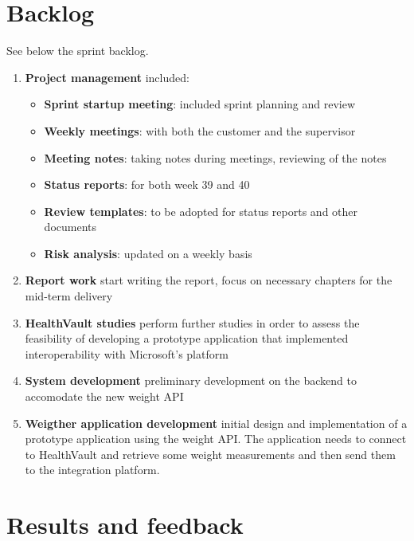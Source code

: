 \section{Backlog}

See below the sprint backlog.
\begin{enumerate}[1.]
	\item \textbf{Project management} included:
	\begin{itemize}
		\item \textbf{Sprint startup meeting}:
			included sprint planning and review
		\item \textbf{Weekly meetings}:
			with both the customer and the supervisor
		\item \textbf{Meeting notes}:
			taking notes during meetings, reviewing of the notes
		\item \textbf{Status reports}:
			for both week 39 and 40
		\item \textbf{Review templates}:
			to be adopted for status reports and other documents
		\item \textbf{Risk analysis}:
			updated on a weekly basis
	\end{itemize}
	\item \textbf{Report work}\newline
		start writing the report, focus on necessary chapters for the mid-term delivery
	\item \textbf{HealthVault studies}\newline
		perform further studies in order to assess the feasibility of developing a prototype
		application that implemented interoperability with Microsoft's platform
	\item \textbf{System development}\newline
		preliminary development on the backend to accomodate the new weight API
	\item \textbf{Weigther application development}\newline
		initial design and implementation of a prototype application using the weight API.
		The application needs to connect to HealthVault and retrieve some weight measurements
		and then send them to the integration platform.
\end{enumerate}


\section{Results and feedback}

